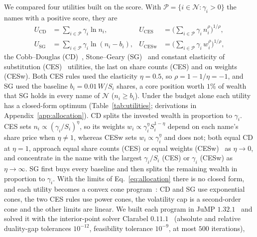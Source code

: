 We compared four utilities built on the score. With $\mathcal{P} = \{ i \in \mathcal{N} : \gamma_i > 0 \}$ the names
with a positive score, they are
\begin{equation}
\begin{aligned}
U_{\mathrm{CD}} &= \sum_{i \in \mathcal{P}} \gamma_i \ln n_i, &
U_{\mathrm{CES}} &= \Big( \sum_{i \in \mathcal{P}} \gamma_i\, n_i^{\rho} \Big)^{1/\rho}, \\
U_{\mathrm{SG}} &= \sum_{i \in \mathcal{P}} \gamma_i \ln \left( n_i - b_i \right), &
U_{\mathrm{CESw}} &= \Big( \sum_{i \in \mathcal{P}} \gamma_i\, w_i^{\rho} \Big)^{1/\rho},
\end{aligned}
\label{eq:utilities}
\end{equation}
the Cobb--Douglas (CD)~\cite{cobbDouglas1928}, Stone--Geary (SG)~\cite{geary1950, stone1954} and constant elasticity
of substitution (CES)~\cite{arrowEtAl1961} utilities, the last on share counts (CES) and on weights (CESw). Both CES
rules used the elasticity $\eta = 0.5$, so $\rho = 1 - 1/\eta = -1$, and SG used the baseline $b_i = 0.01\,W/S_i$
shares, a core position worth $1\%$ of wealth that SG holds in every name of $\mathcal{N}$ ($n_i \ge b_i$). Under the
budget alone each utility has a closed-form optimum (Table~\ref{tab:utilities}; derivations in
Appendix~\ref{app:allocation}). CD splits the invested wealth in proportion to $\gamma_i$. CES sets
$n_i \propto (\gamma_i/S_i)^{\eta}$, so its weights $w_i \propto \gamma_i^{\eta} S_i^{1-\eta}$ depend on each name's
share price when $\eta \ne 1$, whereas CESw sets $w_i \propto \gamma_i^{\eta}$ and does not; both equal CD at
$\eta = 1$, approach equal share counts (CES) or equal weights (CESw)~\cite{demiguelGarlappiUppal2009} as
$\eta \to 0$, and concentrate in the name with the largest $\gamma_i/S_i$ (CES) or $\gamma_i$ (CESw) as
$\eta \to \infty$. SG first buys every baseline and then splits the remaining wealth in proportion to $\gamma_i$.
With the limits of Eq.~\ref{eq:allocation} there is no closed form, and each utility becomes a convex cone
program~\cite{boydVandenberghe2004}: CD and SG use exponential cones, the two CES rules use power cones, the
volatility cap is a second-order cone and the other limits are linear. We built each program in JuMP
$1.32.1$~\cite{lubin2023jump} and solved it with the interior-point solver Clarabel $0.11.1$~\cite{goulart2024clarabel}
(absolute and relative duality-gap tolerances $10^{-12}$, feasibility tolerance $10^{-9}$, at most $500$ iterations),
